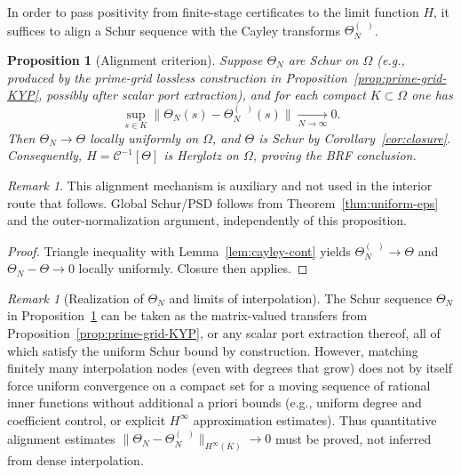\documentclass[11pt]{article}
\newtheorem{proposition}[theorem]{Proposition}
\theoremstyle{definition}
\theoremstyle{remark}
\newtheorem{remark}[theorem]{Remark}
\DeclareMathOperator{\dettwo}{det_2}
\begin{document}
In order to pass positivity from finite-stage certificates to the limit function \(H\), it suffices to align a Schur sequence with the Cayley transforms \(\Theta_N^{(\dettwo)}\).

\begin{proposition}[Alignment criterion]\label{prop:alignment-criterion}
Suppose \(\Theta_N\) are Schur on \(\Omega\) (e.g., produced by the prime-grid lossless construction in Proposition~\ref{prop:prime-grid-KYP}, possibly after scalar port extraction), and for each compact \(K\subset\Omega\) one has
\[
 \sup_{s\in K}\big\|\Theta_N(s)-\Theta_N^{(\dettwo)}(s)\big\|\xrightarrow[N\to\infty]{}0.
\]
Then \(\Theta_N\to\Theta\) locally uniformly on \(\Omega\), and \(\Theta\) is Schur by Corollary~\ref{cor:closure}. Consequently, \(H=\mathcal C^{-1}[\Theta]\) is Herglotz on \(\Omega\), proving the BRF conclusion.
\end{proposition}
\begin{remark}
This alignment mechanism is auxiliary and not used in the interior route that follows. Global Schur/PSD follows from Theorem~\ref{thm:uniform-eps} and the outer-normalization argument, independently of this proposition.
\end{remark}
\begin{proof}
Triangle inequality with Lemma~\ref{lem:cayley-cont} yields \(\Theta_N^{(\dettwo)}\to\Theta\) and \(\Theta_N-\Theta\to 0\) locally uniformly. Closure then applies.
\end{proof}

\begin{remark}[Realization of \(\Theta_N\) and limits of interpolation]
The Schur sequence \(\Theta_N\) in Proposition~\ref{prop:alignment-criterion} can be taken as the matrix-valued transfers from Proposition~\ref{prop:prime-grid-KYP}, or any scalar port extraction thereof, all of which satisfy the uniform Schur bound by construction. However, matching finitely many interpolation nodes (even with degrees that grow) does not by itself force uniform convergence on a compact set for a moving sequence of rational inner functions without additional a priori bounds (e.g., uniform degree and coefficient control, or explicit $H^\infty$ approximation estimates). Thus quantitative alignment estimates \(\|\Theta_N-\Theta_N^{(\dettwo)}\|_{H^\infty(K)}\to 0\) must be proved, not inferred from dense interpolation.
\end{remark}
\end{document}
